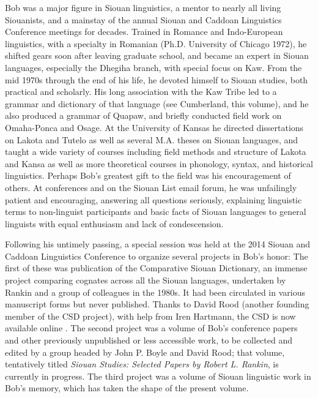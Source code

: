 \begin{refsection}
Bob was a major figure in Siouan linguistics, a mentor to nearly all living Siouanists, and a mainstay of the annual Siouan and Caddoan Linguistics Conference meetings for decades. Trained in Romance and Indo-European linguistics, with a specialty in Romanian (Ph.D. University of Chicago 1972), he shifted gears soon after leaving graduate school, and became an expert in Siouan languages, especially the Dhegiha branch, with special focus on Kaw. From the mid 1970s through the end of his life, he devoted himself to Siouan studies, both practical and scholarly. His long association with the Kaw Tribe led to a grammar and dictionary of that language (see Cumberland, this volume), and he also produced a grammar of Quapaw, and briefly conducted field work on Omaha-Ponca and Osage. At the University of Kansas he directed dissertations on Lakota \citep{Trechter1995} and Tutelo \citep{Oliverio1996} as well as several M.A. theses on Siouan languages, and taught a wide variety of courses including field methods and structure of Lakota and Kansa as well as more theoretical courses in phonology, syntax, and historical linguistics. Perhaps Bob's greatest gift to the field was his encouragement of others. At conferences and on the Siouan List email forum, he was unfailingly patient and encouraging, answering all questions seriously, explaining linguistic terms to non-linguist participants and basic facts of Siouan languages to general linguists with equal enthusiasm and lack of condescension.

Following his untimely passing, a special session was held at the 2014 Siouan and Caddoan Linguistics Conference to organize several projects in Bob's honor: The first of these was publication of the Comparative Siouan Dictionary, an immense project comparing cognates across all the Siouan languages, undertaken by Rankin and a group of colleagues in the 1980s. It had been circulated in various manuscript forms but never published. Thanks to David Rood (another founding member of the CSD project), with help from Iren Hartmann, the CSD is now available online \citep{RankinEtAl2015}. The second project was a volume of Bob's conference papers and other previously unpublished or less accessible work, to be collected and edited by a group headed by John P. Boyle and David Rood; that volume, tentatively titled \textit{Siouan Studies: Selected Papers by Robert L. Rankin}, is currently in progress. The third project was a volume of Siouan linguistic work in Bob's memory, which has taken the shape of the present volume.


\end{refsection}
